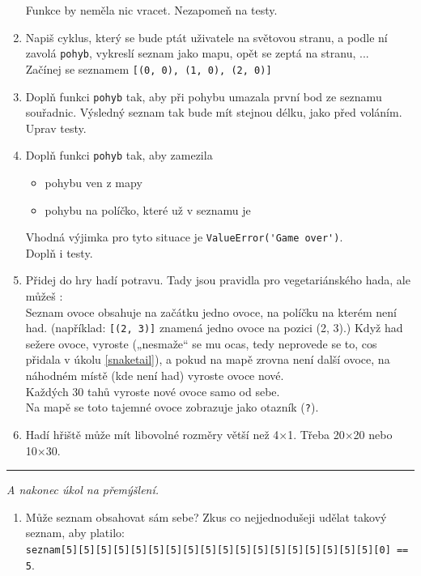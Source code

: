 \documentclass[a4paper,10pt]{article}
\newcommand\startsection[1]{
     \vspace{0.2ex}
    \hrule
    {\fontspec{Oxygen} \tiny
     \vspace{-1ex}
     \emph{#1}
     \vspace{-1.5em}
    }
}
\begin{document}
\begin{enumerate}[resume]
    Funkce by neměla nic vracet.
    Nezapomeň na testy.

\item Napiš cyklus, který se bude ptát uživatele na světovou stranu,
    a podle ní zavolá \verb+pohyb+, vykreslí seznam jako mapu,
    opět se zeptá na stranu, ...
    \\Začínej se seznamem \verb+[(0, 0), (1, 0), (2, 0)]+

\item \label{snaketail}
    Doplň funkci \verb+pohyb+ tak, aby při pohybu umazala první bod ze seznamu
    souřadnic. Výsledný seznam tak bude mít stejnou délku, jako před voláním.
    \\Uprav testy.

\item Doplň funkci \verb+pohyb+ tak, aby zamezila
    \begin{itemize}
    \item pohybu ven z mapy
    \item pohybu na políčko, které už v seznamu je
    \end{itemize}
    Vhodná výjimka pro tyto situace je \verb+ValueError('Game over')+.
    \\Doplň i testy.

\item Přidej do hry hadí potravu. Tady jsou pravidla pro vegetariánského hada,
    ale můžeš :
    \\ Seznam ovoce obsahuje na začátku jedno ovoce, na políčku na kterém není had.
    (například: \texttt{[(2, 3)]} znamená jedno ovoce na pozici (2, 3).)
    Když had sežere ovoce, vyroste („nesmaže“ se mu ocas, tedy neprovede se to,
    cos přidala v úkolu \ref{snaketail}),
    a pokud na mapě zrovna není další ovoce, na náhodném místě (kde není had) vyroste ovoce nové.
    \\Každých 30 tahů vyroste nové ovoce samo od sebe.
    \\Na mapě se toto tajemné ovoce zobrazuje jako otazník (\verb+?+).

\item \label{snakeend}
    Hadí hřiště může mít libovolné rozměry větší než 4×1.
    Třeba 20×20 nebo 10×30.

\end{enumerate}

\startsection{A nakonec úkol na přemýšlení.}

\begin{enumerate}[resume]

\item Může seznam obsahovat sám sebe? Zkus co nejjednodušeji udělat takový seznam, aby platilo:
    \\\verb+seznam[5][5][5][5][5][5][5][5][5][5][5][5][5][5][5][5][5][5][0] == 5+.

\end{enumerate}
\end{document}
